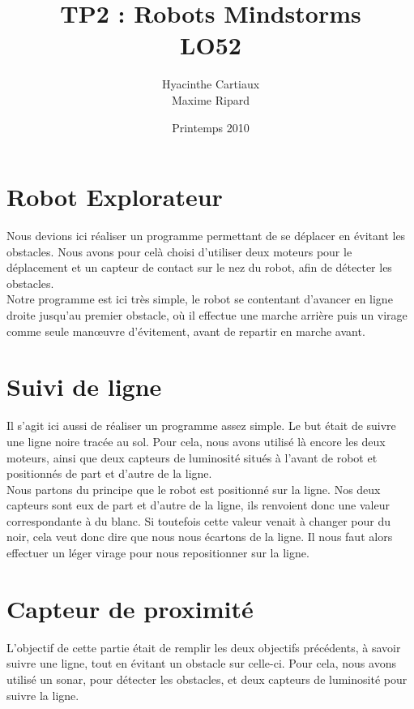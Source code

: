 \documentclass[a4paper]{report}
\title{TP2 : Robots Mindstorms\\LO52}
\author{Hyacinthe Cartiaux\\Maxime Ripard}
\date{Printemps 2010}
\begin{document}
\large
\maketitle
\tableofcontents

\chapter{Robot Explorateur}
Nous devions ici réaliser un programme permettant de se déplacer en évitant
les obstacles. Nous avons pour celà choisi d'utiliser deux moteurs pour le
déplacement et un capteur de contact sur le \og nez \fg du robot, afin de
détecter les obstacles.\\

Notre programme est ici très simple, le robot se contentant d'avancer en
ligne droite jusqu'au premier obstacle, où il effectue une marche arrière
puis un virage comme seule man\oe{}uvre d'évitement, avant de repartir en
marche avant.\\



\chapter{Suivi de ligne}

Il s'agit ici aussi de réaliser un programme assez simple. Le but était de
suivre une ligne noire tracée au sol. Pour cela, nous avons utilisé là
encore les deux moteurs, ainsi que deux capteurs de luminosité situés à
l'avant de robot et positionnés de part et d'autre de la ligne.\\

Nous partons du principe que le robot est positionné sur la ligne. Nos deux
capteurs sont eux de part et d'autre de la ligne, ils renvoient donc une
valeur correspondante à du blanc. Si toutefois cette valeur venait à changer
pour du noir, cela veut donc dire que nous nous écartons de la ligne. Il
nous faut alors effectuer un léger virage pour nous repositionner sur la
ligne.\\



\chapter{Capteur de proximité}

L'objectif de cette partie était de remplir les deux objectifs précédents, à
savoir suivre une ligne, tout en évitant un obstacle sur celle-ci. Pour
cela, nous avons utilisé un sonar, pour détecter les obstacles, et deux
capteurs de luminosité pour suivre la ligne.\\
\end{document}
